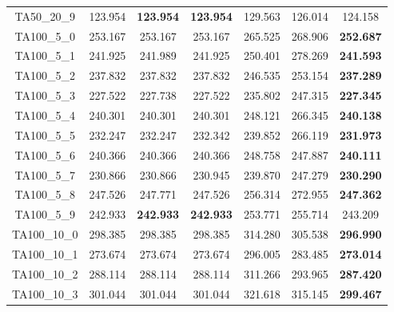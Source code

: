 \begin{tabular}{cc|cc|ccc}
TA50\_20\_9        & 123.954          & {\bf 123.954}    & {\bf 123.954}    & 129.563          & 126.014          & 124.158         \\ 
TA100\_5\_0        & 253.167          & 253.167          & 253.167          & 265.525          & 268.906          & {\bf 252.687}   \\ 
TA100\_5\_1        & 241.925          & 241.989          & 241.925          & 250.401          & 278.269          & {\bf 241.593}   \\ 
TA100\_5\_2        & 237.832          & 237.832          & 237.832          & 246.535          & 253.154          & {\bf 237.289}   \\ 
TA100\_5\_3        & 227.522          & 227.738          & 227.522          & 235.802          & 247.315          & {\bf 227.345}   \\ 
TA100\_5\_4        & 240.301          & 240.301          & 240.301          & 248.121          & 266.345          & {\bf 240.138}   \\ 
TA100\_5\_5        & 232.247          & 232.247          & 232.342          & 239.852          & 266.119          & {\bf 231.973}   \\ 
TA100\_5\_6        & 240.366          & 240.366          & 240.366          & 248.758          & 247.887          & {\bf 240.111}   \\ 
TA100\_5\_7        & 230.866          & 230.866          & 230.945          & 239.870          & 247.279          & {\bf 230.290}   \\ 
TA100\_5\_8        & 247.526          & 247.771          & 247.526          & 256.314          & 272.955          & {\bf 247.362}   \\ 
TA100\_5\_9        & 242.933          & {\bf 242.933}    & {\bf 242.933}    & 253.771          & 255.714          & 243.209         \\ 
TA100\_10\_0       & 298.385          & 298.385          & 298.385          & 314.280          & 305.538          & {\bf 296.990}   \\ 
TA100\_10\_1       & 273.674          & 273.674          & 273.674          & 296.005          & 283.485          & {\bf 273.014}   \\ 
TA100\_10\_2       & 288.114          & 288.114          & 288.114          & 311.266          & 293.965          & {\bf 287.420}   \\ 
TA100\_10\_3       & 301.044          & 301.044          & 301.044          & 321.618          & 315.145          & {\bf 299.467}   \\ 

\end{tabular}
